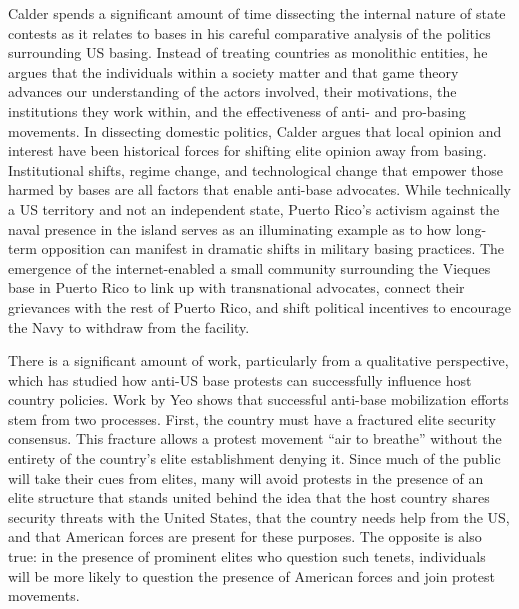 Calder spends a significant amount of time dissecting the internal nature of state contests as it relates to bases in his careful comparative analysis of the politics surrounding US basing.\autocite{calder2007} Instead of treating countries as monolithic entities, he argues that the individuals within a society matter and that game theory advances our understanding of the actors involved, their motivations, the institutions they work within, and the effectiveness of anti- and pro-basing movements. In dissecting domestic politics, Calder argues that local opinion and interest have been historical forces for shifting elite opinion away from basing. Institutional shifts, regime change, and technological change that empower those harmed by bases are all factors that enable anti-base advocates.\autocite{calder2007,Cooley2008} While technically a US territory and not an independent state, Puerto Rico's activism against the naval presence in the island serves as an illuminating example as to how long-term opposition can manifest in dramatic shifts in military basing practices.\autocite{mccaffery2009} The emergence of the internet-enabled a small community surrounding the Vieques base in Puerto Rico to link up with transnational advocates, connect their grievances with the rest of Puerto Rico, and shift political incentives to encourage the Navy to withdraw from the facility.\autocite[\ppno~176-183]{calder2007}


There is a significant amount of work, particularly from a qualitative perspective, which has studied how anti-US base protests can successfully influence host country policies. Work by Yeo \citeyear{Yeo2011} shows that successful anti-base mobilization efforts stem from two processes. First, the country must have a fractured elite security consensus. This fracture allows a protest movement ``air to breathe'' without the entirety of the country's elite establishment denying it. Since much of the public will take their cues from elites, many will avoid protests in the presence of an elite structure that stands united behind the idea that the host country shares security threats with the United States, that the country needs help from the US, and that American forces are present for these purposes. The opposite is also true: in the presence of prominent elites who question such tenets, individuals will be more likely to question the presence of American forces and join protest movements. 

